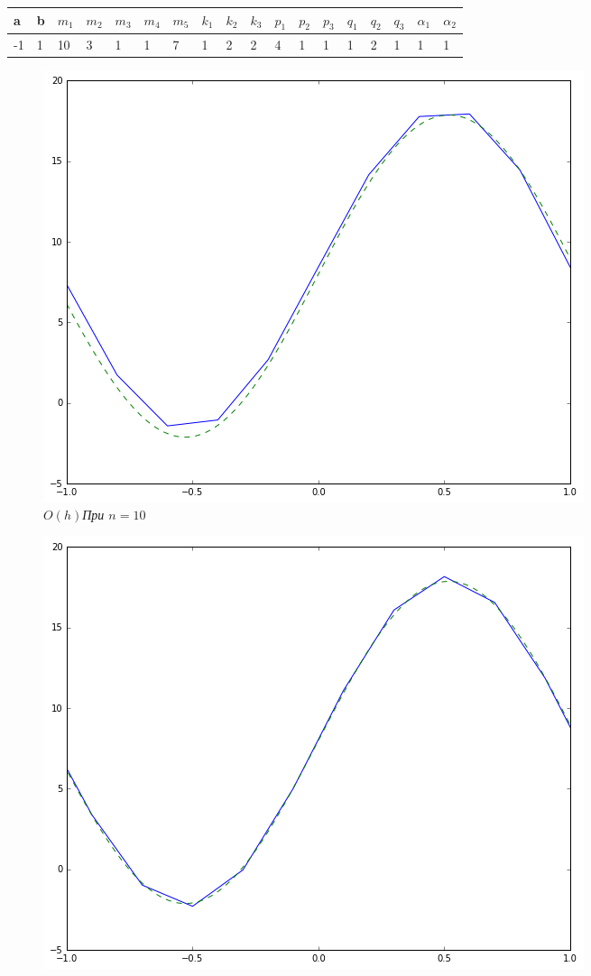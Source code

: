 \begin{figure}[h!]
\begin{center}
    \begin{tabular}{| l | l | l | l | l | l | l | l | l | l | l | l | l | l | l | l | l | l |}
	\hline
	a & b & $m_1$ & $m_2$ & $m_3$ & $m_4$ & $m_5$ & $k_1$ & $k_2$ & $k_3$ & $p_1$ & $p_2$ & $p_3$ & $q_1$ & $q_2$ & $q_3$ & $\alpha_1$ & $\alpha_2$ \\\hline
	-1 & 1 & 10 & 3 & 1 & 1 & 7 & 1 & 2 & 2 & 4 & 1 & 1 & 1 & 2 & 1 & 1 & 1\\ \hline
    \end{tabular}
\end{center}
\bigskip
\centering
\begin{subfigure}{.5\textwidth}
  \centering
  \includegraphics[width=.95\linewidth]{res3_h}
  \caption{\it \(O(h)\)При \(n = 10\)}
  \label{fig:sub1}
\end{subfigure}%
\begin{subfigure}{.5\textwidth}
  \centering
  \includegraphics[width=.95\linewidth]{res3-h2}

\end{subfigure}
\end{figure}

